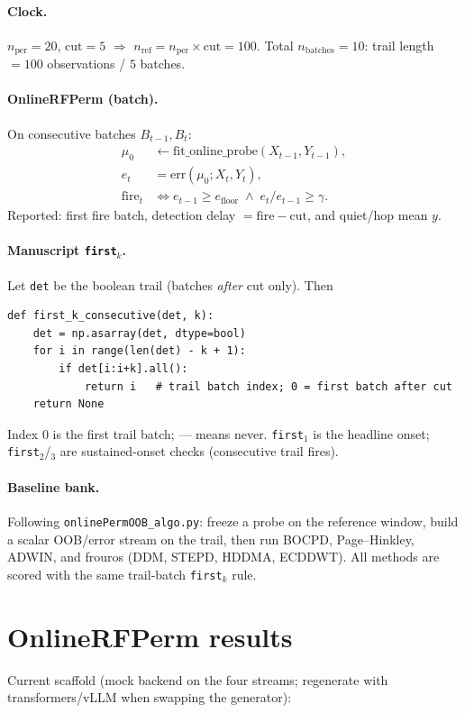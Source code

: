 \documentclass[11pt]{article}
\begin{document}
\paragraph{Clock.}
$n_{\mathrm{per}}=20$, $\mathrm{cut}=5$ $\Rightarrow$
$n_{\mathrm{ref}}=n_{\mathrm{per}}\times\mathrm{cut}=100$.
Total $n_{\mathrm{batches}}=10$: trail length $=100$ observations / $5$ batches.

\paragraph{OnlineRFPerm (batch).}
On consecutive batches $B_{t-1},B_t$:
\begin{align*}
\mu_0 &\leftarrow \mathrm{fit\_online\_probe}(X_{t-1},Y_{t-1}),\\
e_t &= \mathrm{err}(\mu_0; X_t,Y_t),\\
\mathrm{fire}_t &\iff e_{t-1}\ge e_{\mathrm{floor}}
  \;\wedge\; e_t/e_{t-1}\ge \gamma.
\end{align*}
Reported: first fire batch, detection delay $=\mathrm{fire}-\mathrm{cut}$,
and quiet/hop mean $y$.

\paragraph{Manuscript \texttt{first}$_k$.}
Let \texttt{det} be the boolean trail (batches \emph{after} cut only). Then
\begin{verbatim}
def first_k_consecutive(det, k):
    det = np.asarray(det, dtype=bool)
    for i in range(len(det) - k + 1):
        if det[i:i+k].all():
            return i   # trail batch index; 0 = first batch after cut
    return None
\end{verbatim}
Index $0$ is the first trail batch; --- means never.
\texttt{first}$_1$ is the headline onset; \texttt{first}$_2$/$_3$ are
sustained-onset checks (consecutive trail fires).

\paragraph{Baseline bank.}
Following \texttt{onlinePermOOB\_algo.py}: freeze a probe on the reference
window, build a scalar OOB/error stream on the trail, then run BOCPD,
Page--Hinkley, ADWIN, and frouros (DDM, STEPD, HDDMA, ECDDWT). All methods are
scored with the same trail-batch \texttt{first}$_k$ rule.

\section{OnlineRFPerm results}
Current scaffold (mock backend on the four streams; regenerate with
transformers/vLLM when swapping the generator):
\end{document}
